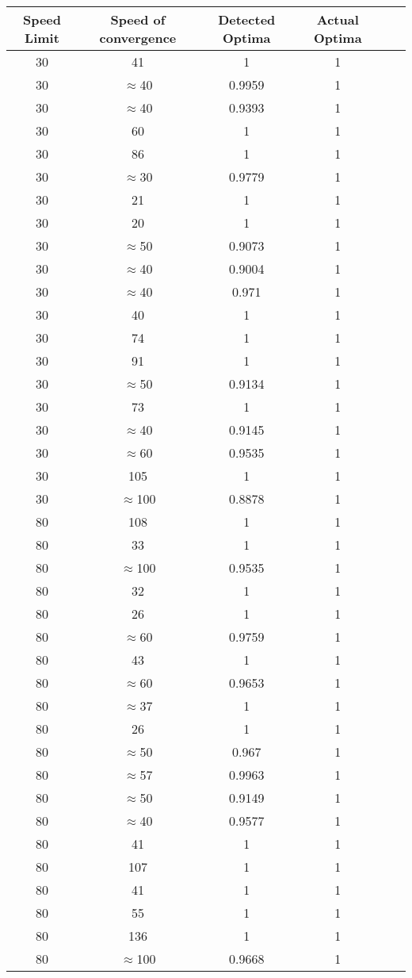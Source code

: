 \documentclass[12pt]{article}
\begin{document}
\begin{table}[h!]
\centering
\begin{tabular}{|c|c|c|c|c|c|}
\textbf{Speed Limit} & Speed of convergence & Detected Optima & Actual Optima \\ \hline
\hline
30 & 41 & 1 & 1 \\ \hline
30 & $\approx$40 & 0.9959 & 1 \\ \hline
30 & $\approx$40 & 0.9393 & 1 \\ \hline
30 & 60 & 1 & 1 \\ \hline
30 & 86 & 1 & 1 \\ \hline
30 & $\approx$30 & 0.9779 & 1 \\ \hline
30 & 21 & 1 & 1 \\ \hline
30 & 20 & 1 & 1 \\ \hline
30 & $\approx$50 & 0.9073 & 1 \\ \hline
30 & $\approx$40 & 0.9004 & 1 \\ \hline
30 & $\approx$40 & 0.971 & 1 \\ \hline
30 & 40 & 1 & 1 \\ \hline
30 & 74 & 1 & 1 \\ \hline
30 & 91 & 1 & 1 \\ \hline
30 & $\approx$50 & 0.9134 & 1 \\ \hline
30 & 73 & 1 & 1 \\ \hline
30 & $\approx$40 & 0.9145 & 1 \\ \hline
30 & $\approx$60 & 0.9535 & 1 \\ \hline
30 & 105 & 1 & 1 \\ \hline
30 & $\approx$100 & 0.8878 & 1 \\ \hline
80 & 108 & 1 & 1 \\ \hline
80 & 33 & 1 & 1 \\ \hline
80 & $\approx$100 & 0.9535 & 1 \\ \hline
80 & 32 & 1 & 1 \\ \hline
80 & 26 & 1 & 1 \\ \hline
80 & $\approx$60 & 0.9759 & 1 \\ \hline
80 & 43 & 1 & 1 \\ \hline
80 & $\approx$60 & 0.9653 & 1 \\ \hline
80 & $\approx$37 & 1 & 1 \\ \hline
80 & 26 & 1 & 1 \\ \hline
80 & $\approx$50 & 0.967 & 1 \\ \hline
80 & $\approx$57 & 0.9963 & 1 \\ \hline
80 & $\approx$50 & 0.9149 & 1 \\ \hline
80 & $\approx$40 & 0.9577 & 1 \\ \hline
80 & 41 & 1 & 1 \\ \hline
80 & 107 & 1 & 1 \\ \hline
80 & 41 & 1 & 1 \\ \hline
80 & 55 & 1 & 1 \\ \hline
80 & 136 & 1 & 1 \\ \hline
80 & $\approx$100 & 0.9668 & 1 \\ \hline
\end{tabular}
\end{table}
\end{document}
